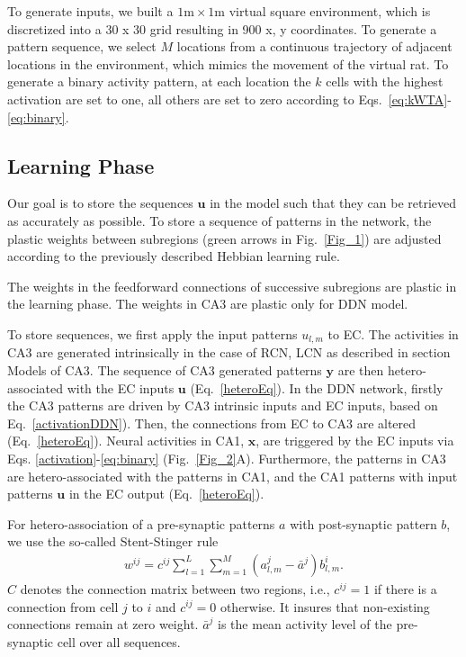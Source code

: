 \documentclass[utf8]{frontiersSCNS} %
\begin{document}
To generate inputs, we built a $1\textrm{m} \times 1\textrm{m}$ virtual square environment, which is discretized into a 30 x 30 grid resulting in 900 x, y coordinates.   
To generate a pattern sequence, we select $M$ locations from a continuous trajectory of adjacent locations in the environment, which mimics the movement of the virtual rat. To generate a binary activity pattern, at each location the $k$ cells with the highest activation are set to one, all others are set to zero according to Eqs.~\ref{eq:kWTA}-\ref{eq:binary}.


\subsection{Learning Phase}
Our goal is to store the sequences $\mathbf u$ in the model such that they can be retrieved as accurately as possible. To store a sequence of patterns in the network, the plastic weights between subregions (green arrows in Fig.~\ref{Fig_1}) are adjusted according to the previously described Hebbian learning rule. 

The weights in the feedforward connections of successive subregions are plastic in the learning phase. The weights in CA3 are plastic only for DDN model.

To store sequences, we first apply the input patterns $u_{l,m}$ to EC. The activities in CA3 are generated intrinsically in the case of RCN, LCN as described in section Models of CA3. The sequence of CA3 generated patterns $\mathbf y$ are then hetero-associated with the EC inputs $\mathbf u$ (Eq.~\ref{heteroEq}). 
%
In the DDN network, firstly the CA3 patterns are driven by CA3 intrinsic inputs and EC inputs, based on Eq.~\ref{activationDDN}). Then, the connections from EC to CA3 are altered (Eq.~\ref{heteroEq}).
%
Neural activities in CA1, $\mathbf x$, are triggered by the EC inputs via Eqs. \ref{activation}-\ref{eq:binary} (Fig.~\ref{Fig_2}A). Furthermore, the patterns in CA3 are hetero-associated with the patterns in CA1, and the CA1 patterns with input patterns $\mathbf u$ in the EC output (Eq.~\ref{heteroEq}). 

For hetero-association of a pre-synaptic patterns $a$ with post-synaptic pattern $b$, we use the so-called Stent-Stinger rule \cite{stent1973physiological}
%
\begin{align}
	\label{heteroEq}
	w^{ij} = c^{ij}\sum_{l=1}^L{\sum_{m=1}^M(a^j_{l, m}  - \bar {a}^j)b_{l, m}^i}.
\end{align}
$C$ denotes the connection matrix between two regions, i.e., $c^{ij} = 1$ if there is a connection from cell $j$ to $i$ and $c^{ij} = 0$ otherwise. It insures that non-existing connections remain at zero weight. $\bar{a}^j$ is the mean activity level of the pre-synaptic cell over all sequences. 
\end{document}
